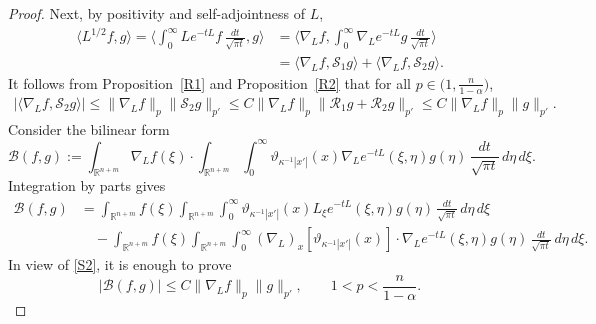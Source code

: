 \documentclass[12pt]{amsart}
\begin{document}
\begin{proof}
Next, by positivity and self-adjointness of $L$,
\begin{align*}
    \langle L^{1/2}f, g \rangle
    = \biggl\langle \int_0^\infty L e^{-tL}f \, \frac{dt}{\sqrt{\pi t}}, g \biggr\rangle
    &= \bigl\langle \nabla_L f, \int_0^\infty \nabla_L e^{-tL}g \, \frac{dt}{\sqrt{\pi t}} \bigr\rangle\\
    &= \langle \nabla_L f, \mathcal{S}_1g \rangle + \langle \nabla_L f, \mathcal{S}_2 g \rangle.
\end{align*}
It follows from Proposition~\ref{R1} and Proposition~\ref{R2} that for all $p\in \bigl(1, \frac{n}{1-\alpha}\bigr)$,
\begin{align}\label{S2}
|\langle \nabla_L f, \mathcal{S}_2 g \rangle|
\le \|\nabla_L f\|_p \|\mathcal{S}_2g\|_{p'}
\le C \|\nabla_L f\|_p \|\mathcal{R}_1g+\mathcal{R}_2g\|_{p'}
\le C \|\nabla_L f\|_p \|g\|_{p'}.
\end{align}
Consider the bilinear form
\begin{equation*}
    \mathcal{B}(f,g) := \int_{\mathbb{R}^{n+m}} \nabla_L f(\xi) \cdot \int_{\mathbb{R}^{n+m}} \int_0^\infty \vartheta_{\kappa^{-1} |x'|}(x) \nabla_L e^{-tL}(\xi,\eta) g(\eta)\,\frac{dt}{\sqrt{\pi t}}\,d\eta\,d\xi.
\end{equation*}
Integration by parts gives
\begin{align}\label{eq:HA}
    \mathcal{B}(f,g)
    &= \int_{\mathbb{R}^{n+m}} f(\xi) \int_{\mathbb{R}^{n+m}} \int_0^\infty \vartheta_{\kappa^{-1} |x'|}(x) L_{\xi} e^{-tL}(\xi,\eta) g(\eta) \, \frac{dt}{\sqrt{\pi t}} \, d\eta \, d\xi \nonumber\\
    &\quad - \int_{\mathbb{R}^{n+m}} f(\xi) \int_{\mathbb{R}^{n+m}} \int_0^\infty (\nabla_L)_x [\vartheta_{\kappa^{-1} |x'|}(x)] \cdot \nabla_L e^{-tL}(\xi,\eta) g(\eta) \, \frac{dt}{\sqrt{\pi t}} \, d\eta \, d\xi.
\end{align}
In view of \eqref{S2}, it is enough to prove
\begin{equation*}
    |\mathcal{B}(f,g)| \le C \|\nabla_L f\|_p \|g\|_{p'},\qquad 1<p<\frac{n}{1-\alpha}.
\end{equation*}


\end{proof}
\end{document}
